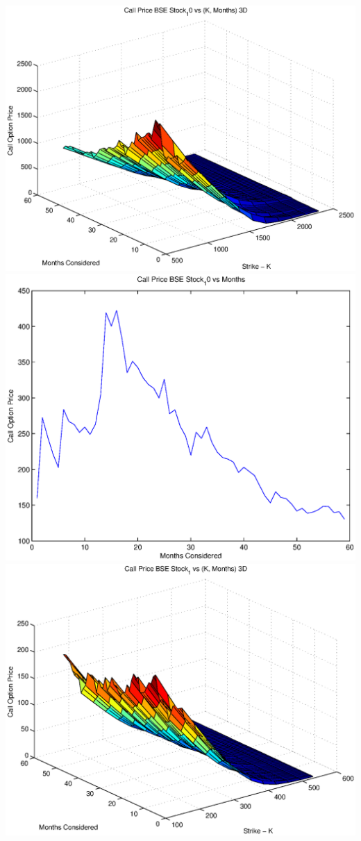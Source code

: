 \documentclass{article}
\begin{document}
\includegraphics[width=\textwidth]{Call_Price_BSE_Stock_10_vs_(K,_Months)_3D} \\

\includegraphics[width=\textwidth]{Call_Price_BSE_Stock_10_vs_Months} \\

\includegraphics[width=\textwidth]{Call_Price_BSE_Stock_1_vs_(K,_Months)_3D} \\
\end{document}
